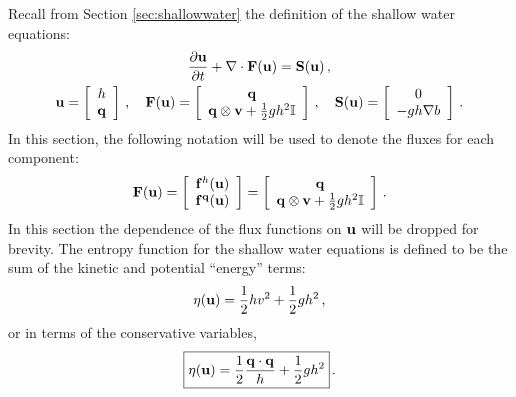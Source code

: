 Recall from Section \ref{sec:shallowwater} the definition of the shallow
water equations:
\begin{equation}
\begin{gathered}
  \ppt{\vectorsolution} + \nabla\cdot\consfluxvector
  = \conssource \eqc
\\
  \vectorsolution
    = \left[\begin{array}{c}\height\\\heightmomentum\end{array}\right]
  \eqc\quad
  \consfluxvector
  = \left[\begin{array}{c}\heightmomentum\\
    \heightmomentum\otimes\velocity + \half\gravity\height^2\mathbb{I}
    \end{array}\right]
  \eqc\quad
  \conssource
  = \left[\begin{array}{c}0\\-\gravity\height\nabla\bathymetry\end{array}
    \right] \eqp
\end{gathered}
\end{equation}
In this section, the following notation will be used to denote the fluxes
for each component:
\begin{equation}
  \consfluxvector
  = \left[\begin{array}{c}
    \mathbf{\consfluxletter}^\height(\vectorsolution)\\
    \mathbf{\consfluxletter}^\heightmomentum(\vectorsolution)
    \end{array}\right]
  = \left[\begin{array}{c}\heightmomentum\\
    \heightmomentum\otimes\velocity + \half\gravity\height^2\mathbb{I}
    \end{array}\right] \eqp
\end{equation}
In this section the dependence of the flux functions on $\mathbf{u}$
will be dropped for brevity.
The entropy function for the shallow water equations is defined to be
the sum of the kinetic and potential ``energy'' terms:
\begin{equation}
  \eta(\mathbf{u}) = \frac{1}{2}hv^2 + \frac{1}{2}gh^2
  \,,
\end{equation}
or in terms of the conservative variables,
\begin{equation}
  \boxed{
    \eta(\mathbf{u}) = \frac{1}{2}\frac{\mathbf{q}\cdot\mathbf{q}}
    {h} + \frac{1}{2}gh^2
  } \,.
\end{equation}
